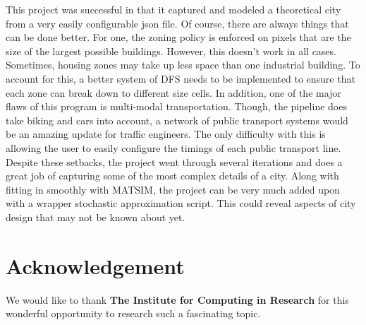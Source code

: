 \documentclass[11pt]{article}
\begin{document}
\begin{multicols}{2}
    \quad This project was successful in that it captured and modeled a theoretical city from a very easily configurable json file. Of course, there are always things that can be done better. For one, the zoning policy is enforced on pixels that are the size of the largest possible buildings. However, this doesn't work in all cases. Sometimes, housing zones may take up less space than one industrial building. To account for this, a better system of DFS needs to be implemented to ensure that each zone can break down to different size cells. In addition, one of the major flaws of this program is multi-modal transportation. Though, the pipeline does take biking and cars into account, a network of public transport systems would be an amazing update for traffic engineers. The only difficulty with this is allowing the user to easily configure the timings of each public transport line. Despite these setbacks, the project went through several iterations and does a great job of capturing some of the most complex details of a city. Along with fitting in smoothly with MATSIM, the project can be very much added upon with a wrapper stochastic approximation script. This could reveal aspects of city design that may not be known about yet.

    \section*{Acknowledgement}
    We would like to thank \textbf{The Institute for Computing in Research} for this wonderful opportunity to research such a fascinating topic.
\end{multicols}

\pagebreak



\end{document}
